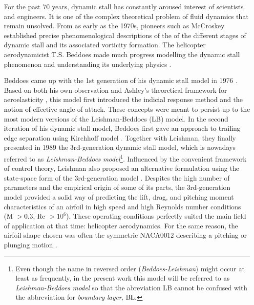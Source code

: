 For the past 70 years, dynamic stall has constantly aroused interest of scientists and engineers. 
It is one of the complex theoretical problem of fluid dynamics that remain unsolved.
From as early as the 1970s, pioneers such as McCroskey \cite{mccroskey_dynamic_1976} established precise phenomenological descriptions of the of the different stages of dynamic stall and its associated vorticity formation. The helicopter aerodynamicist T.S. Beddoes made much progress modelling the dynamic stall phenomenon and understanding its underlying physics \cite{beddoes_synthesis_1976, beddoes_representation_1983}. 

Beddoes came up with the 1st generation of his dynamic stall model in 1976 \cite{beddoes_synthesis_1976}.
Based on both his own observation and Ashley's theoretical framework for aeroelasticity \cite{ashley_piston_1956}, this model first introduced the indicial response method and the notion of effective angle of attack. These concepts were meant to persist up to the most modern versions of the Leishman-Beddoes (LB) model. 
In the second iteration of his dynamic stall model, Beddoes first gave an approach to trailing edge separation using Kirchhoff model \cite{beddoes_representation_1983}. 
Together with Leishman, they finally presented in 1989 the 3rd-generation \cite{leishman_semi-empirical_1989} dynamic stall model, which is nowadays referred to as \textit{Leishman-Beddoes model}\footnote{Even though the name in reversed order (\textit{Beddoes-Leishman}) might occur at least as frequently, in the present work this model will be referred to as \textit{Leishman-Beddoes model} so that the abreviation LB cannot be confused with the abbreviation for \textit{boundary layer}, BL.}.
Influenced by the convenient framework of control theory, Leishman also proposed an alternative formulation using the state-space form of the 3rd-generation model \cite{leishman_state-space_1989}.
Despites the high number of parameters and the empirical origin of some of its parts, the 3rd-generation model provided a solid way of predicting the lift, drag, and pitching moment characteristics of an airfoil in high speed and high Reynolds number conditions (M $>0.3$, Re $> 10^6$). These operating conditions perfectly suited the main field of application at that time: helicopter aerodynamics. For the same reason, the airfoil shape chosen was often the symmetric NACA0012 describing a pitching or plunging motion \cite{beddoes_representation_1983,leishman_semi-empirical_1989,sheng_new_2006,sheng_improved_2007, tank_possibility_2017,rocchio_simple_2020}. 

